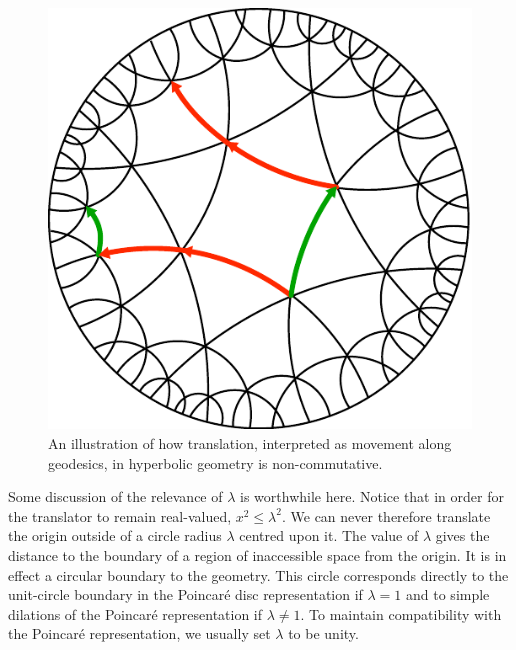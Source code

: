 \begin{figure} \centering
\includegraphics[width=0.9\columnwidth]{circlimitgrid}
\caption{An illustration of how translation, interpreted as movement along
geodesics, in hyperbolic geometry is non-commutative.
\label{fig:limitgrid}}
\end{figure}

Some discussion of the relevance of $\lambda$ is worthwhile here. Notice that
in order for the translator to remain real-valued, $x^2 \le \lambda^2$. 
We can never therefore translate the origin outside of a circle radius
$\lambda$ centred upon it. The value of $\lambda$ gives the distance to
the boundary of a region of inaccessible space from the origin. It is
in effect a circular boundary to the geometry. This circle corresponds
directly to the unit-circle boundary in the Poincar\'e disc representation if
$\lambda = 1$ and to simple dilations of the Poincar\'e representation if
$\lambda \ne 1$. To maintain compatibility with the Poincar\'e representation,
we usually set $\lambda$ to be unity.

